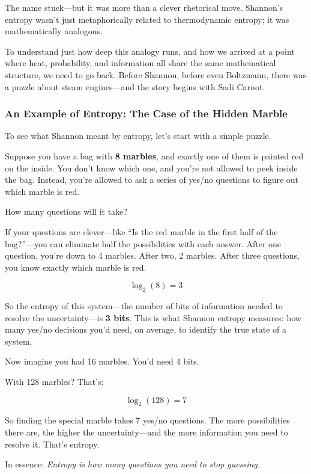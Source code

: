 The name stuck—but it was more than a clever rhetorical move. Shannon’s entropy wasn’t just metaphorically related to thermodynamic entropy; it was mathematically analogous. 

To understand just how deep this analogy runs, and how we arrived at a point where heat, probability, and information all share the same mathematical structure, we need to go back. Before Shannon, before even Boltzmann, there was a puzzle about steam engines—and the story begins with Sadi Carnot.


\subsubsection{An Example of Entropy: The Case of the Hidden Marble}

To see what Shannon meant by entropy, let’s start with a simple puzzle.

Suppose you have a bag with \textbf{8 marbles}, and exactly one of them is painted red on the inside. You don’t know which one, and you’re not allowed to peek inside the bag. Instead, you’re allowed to ask a series of yes/no questions to figure out which marble is red.

How many questions will it take?

If your questions are clever—like “Is the red marble in the first half of the bag?”—you can eliminate half the possibilities with each answer. After one question, you’re down to 4 marbles. After two, 2 marbles. After three questions, you know exactly which marble is red.

\[
\log_2(8) = 3
\]

So the entropy of this system—the number of bits of information needed to resolve the uncertainty—is \textbf{3 bits}. This is what Shannon entropy measures: how many yes/no decisions you’d need, on average, to identify the true state of a system.

\medskip

Now imagine you had 16 marbles. You’d need 4 bits.

With 128 marbles? That’s:

\[
\log_2(128) = 7
\]

So finding the special marble takes 7 yes/no questions. The more possibilities there are, the higher the uncertainty—and the more information you need to resolve it. That’s entropy.

\medskip

In essence: \textit{Entropy is how many questions you need to stop guessing.}


